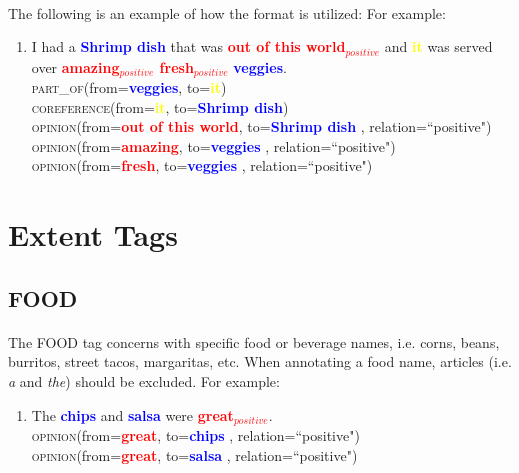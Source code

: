 \documentclass{article}
\begin{document}
\paragraph{}
The following is an example of how the format is utilized:
For example:
\begin{enumerate}
\item I had a \textbf{\textcolor{blue}{Shrimp dish}} that was \textbf{\textcolor{red}{out of this world$_{positive}$}} and \textbf{\textcolor{yellow}{it}} was served over \textbf{\textcolor{red}{amazing$_{positive}$ fresh$_{positive}$}} \textbf{\textcolor{blue}{veggies}}. \\
\textsc{part\_of}(from=\textbf{\textcolor{blue}{veggies}}, to=\textbf{\textcolor{yellow}{it}}) \\
\textsc{coreference}(from=\textbf{\textcolor{yellow}{it}}, to=\textbf{\textcolor{blue}{Shrimp dish}})\\
\textsc{opinion}(from=\textbf{\textcolor{red}{out of this world}}, to=\textbf{\textcolor{blue}{Shrimp dish}} , relation=``positive")\\
\textsc{opinion}(from=\textbf{\textcolor{red}{amazing}}, to=\textbf{\textcolor{blue}{veggies}} , relation=``positive")\\
\textsc{opinion}(from=\textbf{\textcolor{red}{fresh}}, to=\textbf{\textcolor{blue}{veggies}} , relation=``positive")
\end{enumerate}

\newpage
\section{Extent Tags}

\subsection{FOOD}
\paragraph{}
The FOOD tag concerns with specific food or beverage names, i.e. corns, beans, burritos, street tacos, margaritas, etc. When annotating a food name, articles (i.e. \textit{a} and \textit{the}) should be excluded. For example:
\begin{enumerate}[resume]
\item The \textbf{\textcolor{blue}{chips}} and \textbf{\textcolor{blue}{salsa}} were \textbf{\textcolor{red}{great$_{positive}$}}.\\
\textsc{opinion}(from=\textbf{\textcolor{red}{great}}, to=\textbf{\textcolor{blue}{chips}} , relation=``positive")\\
\textsc{opinion}(from=\textbf{\textcolor{red}{great}}, to=\textbf{\textcolor{blue}{salsa}} , relation=``positive")
\end{enumerate}
\end{document}
